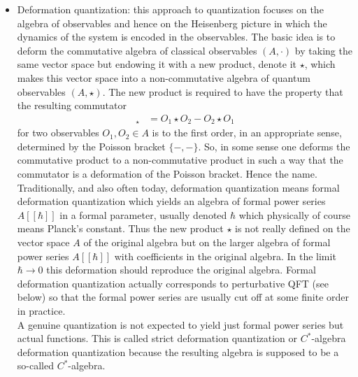 \begin{itemize}
\item
Deformation quantization: this approach to quantization focuses on the algebra of observables and hence on the Heisenberg picture in which the dynamics of the system is encoded in the observables. The basic idea is to deform the commutative algebra of classical observables $(A,\cdot)$ by taking the same vector space but endowing it with a new product, denote it $\star$, which makes this vector space into a non-commutative algebra of quantum observables $(A,\star)$. The new product is required to have the property that the resulting commutator
\begin{align*}
  [O_{1},O_{2}]_{\star}
  &=
  O_{1}
  \star
  O_{2}
  -
  O_{2}
  \star
  O_{1}
\end{align*}
for two observables $O_{1},O_{2} \in A$ is to the {\glqq}first order{\grqq}, in an appropriate sense, determined by the Poisson bracket $\lbrace -,- \rbrace$. So, in some sense one deforms the commutative product to a non-commutative product in such a way that the commutator is a deformation of the Poisson bracket. Hence the name.
\\
Traditionally, and also often today, deformation quantization means formal deformation quantization which yields an algebra of formal power series $A[[\hbar]]$ in a formal parameter, usually denoted $\hbar$ which physically of course means Planck's constant. Thus the new product $\star$ is not really defined on the vector space $A$ of the original algebra but on the larger algebra of formal power series $A[[\hbar]]$ with coefficients in the original algebra. In the limit $\hbar \to 0$ this deformation should reproduce the original algebra. Formal deformation quantization actually corresponds to perturbative QFT (see below) so that the formal power series are usually cut off at some finite order in practice.
\\
A {\glqq}genuine{\grqq} quantization is not expected to yield just formal power series but actual functions. This is called strict deformation quantization or $C^{\ast}$-algebra deformation quantization because the resulting algebra is supposed to be a so-called $C^{\ast}$-algebra. 


\end{itemize}
